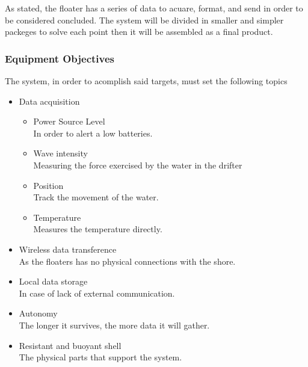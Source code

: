 As stated, the floater has a series of data to acuare, format, and send in order to 
be considered concluded. The system will be divided in smaller and simpler packeges to solve
each point then it will be assembled as a final product.

\subsubsection{Equipment Objectives}
The system, in order to acomplish said targets, must set the following topics

\begin{itemize}
    \item Data acquisition
    \begin{itemize}
        \item Power Source Level \\ In order to alert a low batteries.
        \item Wave intensity \\ Measuring the force exercised by the water in the drifter
        \item Position \\ Track the movement of the water.
        \item Temperature \\ Measures the temperature directly.
    \end{itemize}
    \item Wireless data transference \\ As the floaters has no physical connections with the shore. 
    \item Local data storage \\ In case of lack of external communication.
    \item Autonomy \\ The longer it survives, the more data it will gather.
    \item Resistant and buoyant shell \\ The physical parts that support the system.
\end{itemize}





